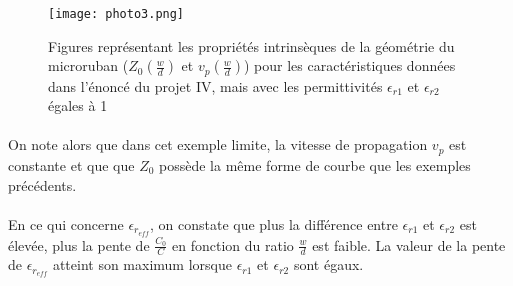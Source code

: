 \begin{figure}[htb]
\begin{center}
\texttt{[image: photo3.png]}
\caption{Figures représentant les propriétés intrinsèques de la géométrie du microruban ($Z_0 (\frac{w}{d})$ et $v_p(\frac{w}{d})$) pour les caractéristiques données dans l'énoncé du projet IV, mais avec les permittivités $\epsilon_{r1}$ et $\epsilon_{r2}$ égales à 1}
\label{mangemoilcul}
\end{center}
\end{figure}

\paragraph{}On note alors que dans cet exemple limite, la vitesse de propagation $v_p$ est constante et que que $Z_0$ possède la même forme de courbe que les exemples précédents. 

\paragraph{}En ce qui concerne $\epsilon_{r_{eff}}$, on constate que plus la différence entre $\epsilon_{r1}$ et $\epsilon_{r2}$ est élevée, plus la pente de $\frac{C_0}{C}$ en fonction du ratio $\frac{w}{d}$ est faible. La valeur de la pente de $\epsilon_{r_{eff}}$ atteint son maximum lorsque $\epsilon_{r1}$ et $\epsilon_{r2}$ sont égaux. 
